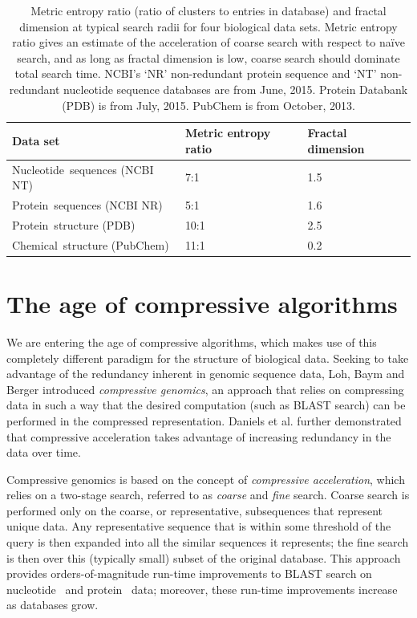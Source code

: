 \documentclass{acm_proc_article-sp}
\begin{document}
\begin{table}
\label{fractal}
\caption{Metric entropy ratio (ratio of clusters to entries in database) and
fractal dimension at typical search radii for four biological data sets. Metric entropy ratio gives an estimate of the acceleration of coarse search with respect to na\"ive search, and as long as fractal dimension is low, coarse search should dominate total search time.
NCBI's `NR' non-redundant protein sequence and `NT' non-redundant nucleotide sequence databases are from June, 2015. Protein Databank (PDB) is from July, 2015. PubChem is from October, 2013.}
\tabcolsep=0.11cm
\begin{tabular}{H{3.0cm}p{2.2cm}p{1.8cm}}
\hline
Data set & Metric entropy ratio & Fractal dimension \\        
\hline
Nucleotide~sequences (NCBI NT) & 7:1 & 1.5\\
\hline
Protein~sequences (NCBI NR) & 5:1 & 1.6\\
\hline
Protein~structure (PDB) & 10:1 & 2.5\\
\hline
Chemical~structure (PubChem) & 11:1 & 0.2\\
\hline
\end{tabular}
\end{table}

\section{The age of compressive algorithms}\label{omics}

We are entering the age of compressive algorithms, 
which makes use of this completely different paradigm for the structure of biological data.
Seeking to take advantage of the redundancy inherent in genomic sequence data, 
Loh, Baym and Berger \cite{loh2012compressive}
introduced \emph{compressive genomics}, an approach that relies on compressing
data in such a way that the desired computation (such as BLAST search) can be
performed in the compressed representation.
Daniels et al. \cite{daniels2013compressive} further demonstrated that
compressive acceleration takes advantage of increasing redundancy in the
data over time.

Compressive genomics is based on the concept of \emph{compressive acceleration},
which relies on a two-stage search, referred to as \emph{coarse} and \emph{fine} search.
Coarse search is performed only on the coarse, or representative, subsequences
that represent unique data.
Any representative sequence that is within some threshold of the query is then expanded 
into all the similar sequences it represents; the fine search is then over this
(typically small) subset of the original database.
This approach provides orders-of-magnitude run-time improvements to BLAST search on 
nucleotide~\cite{loh2012compressive} and protein~\cite{daniels2013compressive}
data; moreover, these run-time improvements increase as databases grow.
\end{document}
